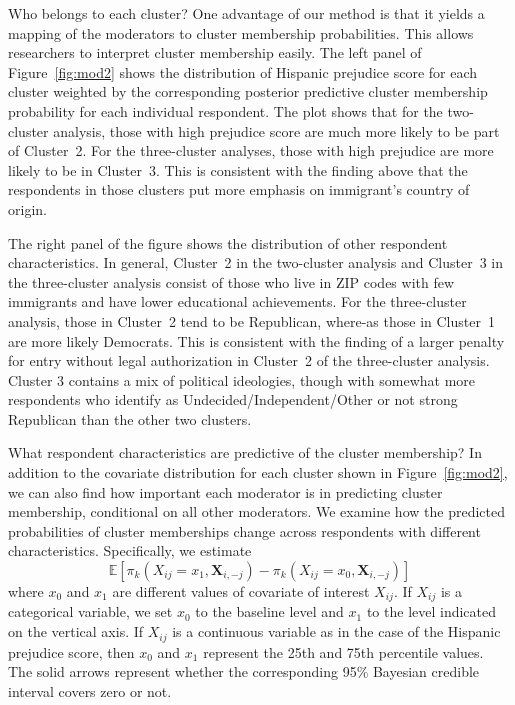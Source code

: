 \documentclass[11pt]{article}
\begin{document}
Who belongs to each cluster? One advantage of our method is that it yields a mapping of the moderators to cluster membership probabilities. This allows researchers to interpret cluster membership easily.
The left panel of Figure~\ref{fig:mod2} shows the distribution of
Hispanic prejudice score for each cluster weighted by the
corresponding posterior predictive cluster membership probability for each
individual respondent.  The plot shows that for the two-cluster
analysis, those with high prejudice score are much more likely to be
part of Cluster~2. For the three-cluster analyses, those with high
prejudice are more likely to be in Cluster~3. This is consistent with
the finding above that the respondents in those clusters put more
emphasis on immigrant's country of origin.

The right panel of the figure shows the distribution of other
respondent characteristics.  In general, Cluster~2 in the two-cluster
analysis and Cluster~3 in the three-cluster analysis consist of those
who live in ZIP codes with few immigrants and have lower educational
achievements.  For the three-cluster analysis, those in Cluster~2 tend
to be Republican, where-as those in Cluster~1 are more likely
Democrats.  This is consistent with the finding of a larger penalty
for entry without legal authorization in Cluster~2 of the
three-cluster analysis.  Cluster 3 contains a mix of political
ideologies, though with somewhat more respondents who identify as
Undecided/Independent/Other or not strong Republican than the other
two clusters.

What respondent characteristics are predictive of the cluster membership? 
In addition to the covariate distribution for each cluster shown in
Figure~\ref{fig:mod2}, we can also find how important each moderator is in predicting cluster membership, conditional on all other moderators.
We examine how the predicted probabilities of cluster
memberships change across respondents with different characteristics.
Specifically, we estimate
\begin{equation}
\label{eq:mfx_moderator}
\mathbb{E}\left[\pi_k(X_{ij} = x_1, \bm{X}_{i,-j}) - \pi_{k}(X_{ij} =
  x_0, \bm{X}_{i,-j})\right]
\end{equation}
where $x_0$ and $x_1$ are different values of covariate of interest
$X_{ij}$.  If $X_{ij}$ is a categorical variable, we set $x_0$ to the
baseline level and $x_1$ to the level indicated on the vertical axis.
If $X_{ij}$ is a continuous variable as in the case of the Hispanic
prejudice score, then $x_0$ and $x_1$ represent the 25th and 75th
percentile values.  The solid arrows represent whether the
corresponding 95\% Bayesian credible interval covers zero or not.
\end{document}
